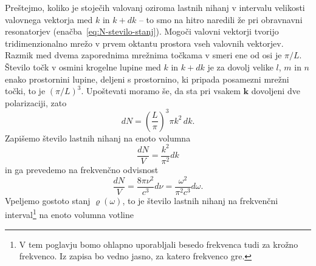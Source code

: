 Preštejmo, koliko je stoječih valovanj oziroma lastnih nihanj 
v intervalu velikosti valovnega
vektorja med $k$ in $k+dk$ -- to smo na hitro naredili že pri obravnavni
resonatorjev (enačba~\ref{eq:N-stevilo-stanj}). Mogoči valovni vektorji tvorijo tridimenzionalno
mrežo v prvem oktantu prostora vseh valovnih vektorjev. Razmik med
dvema zaporednima mrežnima točkama v smeri ene od osi je $\pi/L$.
Število točk v osmini krogelne lupine med $k$ in $k+dk$ je za dovolj
velike $l$, $m$ in $n$ enako prostornini lupine, deljeni
s prostornino, ki pripada posamezni mrežni točki, to je $(\pi/L)^{3}$.
Upoštevati moramo še, da sta pri vsakem $\mathbf{k}$ dovoljeni dve polarizaciji, zato
\begin{equation}
dN=\left(\frac{L}{\pi}\right)^{3}\pi k^{2}\, dk.
\label{4.2}
\end{equation}
Zapišemo število lastnih nihanj na enoto volumna
\begin{equation}
\frac{dN}{V}=\frac{ k^{2}}{\pi^{2}} dk
\label{4.3}
\end{equation}
in ga prevedemo na frekvenčno odvisnost
\begin{equation}
\frac{dN}{V}=\frac{8 \pi \nu^{2} }{c^{3}}d\nu = \frac{\omega^2}{\pi^2c^3}d\omega.
\end{equation}
Vpeljemo gostoto stanj  $\varrho (\omega)$, to je število lastnih nihanj na 
frekvenčni interval\footnote{V tem poglavju bomo ohlapno uporabljali besedo
frekvenca tudi za krožno frekvenco. Iz zapisa bo vedno jasno, za katero frekvenco gre.}
na enoto volumna votline

